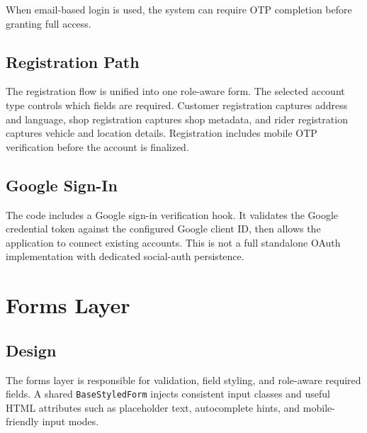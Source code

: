 \documentclass[12pt,a4paper]{article}
\begin{document}
When email-based login is used, the system can require OTP completion before granting full access.

\subsection{Registration Path}
The registration flow is unified into one role-aware form. The selected account type controls which fields are required. Customer registration captures address and language, shop registration captures shop metadata, and rider registration captures vehicle and location details. Registration includes mobile OTP verification before the account is finalized.

\subsection{Google Sign-In}
The code includes a Google sign-in verification hook. It validates the Google credential token against the configured Google client ID, then allows the application to connect existing accounts. This is not a full standalone OAuth implementation with dedicated social-auth persistence.

\section{Forms Layer}
\subsection{Design}
The forms layer is responsible for validation, field styling, and role-aware required fields. A shared \texttt{BaseStyledForm} injects consistent input classes and useful HTML attributes such as placeholder text, autocomplete hints, and mobile-friendly input modes.
\end{document}
